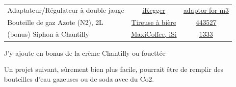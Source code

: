 \documentclass[a4paper,11pt]{article}
\begin{document}
\begin{blogmain}
\begin{table}[htb]
\begin{tabular}{|l|c|c|}
    Adaptateur/Régulateur à double jauge &
    \href{https://ikegger.eu/fr}{iKegger} &
    \href{https://ikegger.eu/fr/products/nitrogen-bottle-adaptor-for-m3-dual-gauge-multi-gas-regulator}{adaptor-for-m3} \\

    Bouteille de gaz Azote (N2), 2L &
    \href{https://www.tireusesabiere.fr}{Tireuse à bière} &
    \href{https://www.tireusesabiere.fr/bouteille-d-azote-2-l-n2-avec-porte-bouteille/a-452064}{443527} \\

    (bonus) Siphon à Chantilly &
    \href{https://www.maxicoffee.com/siphon-isi-m-13.html}{MaxiCoffee, iSi} &
    \href{https://www.maxicoffee.com/siphon-chantilly-cream-profi-whip-inox-brosse-p-1333.html}{1333} \\

    \hline
  \end{tabular}
\end{table}

J'y ajoute en bonus de la crème Chantilly ou fouettée

Un projet suivant, sûrement bien plus facile, pourrait être de remplir des bouteilles d'eau gazeuses ou de soda avec du Co2.
\end{blogmain}
\end{document}
